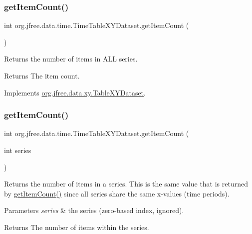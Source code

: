 \subsubsection{\texorpdfstring{get\+Item\+Count()}{getItemCount()}\hspace{0.1cm}{\footnotesize\ttfamily [1/2]}}
{\footnotesize\ttfamily int org.\+jfree.\+data.\+time.\+Time\+Table\+X\+Y\+Dataset.\+get\+Item\+Count (\begin{DoxyParamCaption}{ }\end{DoxyParamCaption})}

Returns the number of items in A\+LL series.

\begin{DoxyReturn}{Returns}
The item count. 
\end{DoxyReturn}


Implements \mbox{\hyperlink{interfaceorg_1_1jfree_1_1data_1_1xy_1_1_table_x_y_dataset_ad9cd378be982c1d61cfb93a16370b6f0}{org.\+jfree.\+data.\+xy.\+Table\+X\+Y\+Dataset}}.

\mbox{\label{classorg_1_1jfree_1_1data_1_1time_1_1_time_table_x_y_dataset_a28caf1b2b3803db97d1b4548a7f26d42}} 
\subsubsection{\texorpdfstring{get\+Item\+Count()}{getItemCount()}\hspace{0.1cm}{\footnotesize\ttfamily [2/2]}}
{\footnotesize\ttfamily int org.\+jfree.\+data.\+time.\+Time\+Table\+X\+Y\+Dataset.\+get\+Item\+Count (\begin{DoxyParamCaption}\item[{int}]{series }\end{DoxyParamCaption})}

Returns the number of items in a series. This is the same value that is returned by \mbox{\hyperlink{classorg_1_1jfree_1_1data_1_1time_1_1_time_table_x_y_dataset_ad80a7fca84f962b49d80b1c1f4f745a4}{get\+Item\+Count()}} since all series share the same x-\/values (time periods).


\begin{DoxyParams}{Parameters}
{\em series} & the series (zero-\/based index, ignored).\\
\hline
\end{DoxyParams}
\begin{DoxyReturn}{Returns}
The number of items within the series. 
\end{DoxyReturn}


